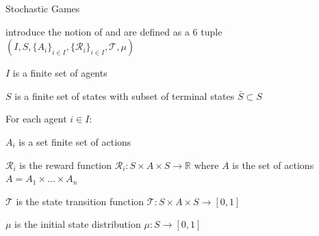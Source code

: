 \begin{frame}{Stochastic Games}

     introduce the notion of  and are defined as a 6 tuple \((I, S, \{A_i\}_{i \in I}, \{\mathcal{R}_i\}_{i \in I}, \mathcal{T}, \mu)\)
    \vspace{10pt}
    \blist
        \item $I$ is a finite set of agents
        \item $S$ is a finite set of states with subset of terminal states $\bar{S} \subset S$
        \item For each agent $i \in I$:
        \blist
            \item $A_i$ is a set finite set of actions
            \item $\mathcal{R}_i$ is the reward function $\mathcal{R}_i : S \times A \times S \to \mathbb{R}$ where $A$ is the set of  actions $A = A_1 \times ... \times A_n$
        \elist
        \item $\mathcal{T}$ is the state transition function $\mathcal{T}: S \times A \times S \to [0, 1]$
        \item $\mu$ is the initial state distribution $\mu: S \to [0, 1]$
    \elist

\end{frame}


